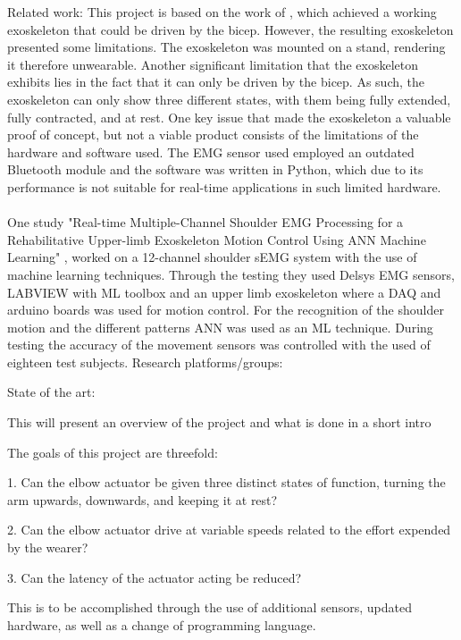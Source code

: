    Related work: %
        This project is based on the work of \cite{AFES}, which achieved a working exoskeleton that could be driven by the bicep. However, the resulting 
        exoskeleton presented some limitations. The exoskeleton was mounted on a stand, rendering it therefore unwearable. Another significant limitation 
        that the exoskeleton exhibits lies in the fact that it can only be driven by the bicep. As such, the exoskeleton can only show three different states, 
        with them being fully extended, fully contracted, and at rest. One key issue that made the exoskeleton a valuable proof of concept, but not a viable 
        product consists of the limitations of the hardware and software used. The EMG sensor used employed an outdated Bluetooth module and the software was 
        written in Python, which due to its performance is not suitable for real-time applications in such limited hardware. 
        \\\\
        One study "Real-time Multiple-Channel Shoulder EMG Processing for a Rehabilitative Upper-limb Exoskeleton Motion Control Using ANN Machine Learning" \cite{shoulderexo},
        worked on a 12-channel shoulder sEMG system with the use of machine learning techniques. Through the testing they used Delsys EMG sensors, LABVIEW with ML toolbox and an 
        upper limb exoskeleton where a DAQ and arduino boards was used for motion control. For the recognition of the shoulder motion and the different patterns ANN was used as an 
        ML technique. During testing the accuracy of the movement sensors was controlled with the used of eighteen test subjects.
    Research platforms/groups:

    State of the art:


    This will present an overview of the project and what is done in a short intro


The goals of this project are threefold:

1. Can the elbow actuator be given three distinct states of function, turning the arm upwards, downwards, and keeping it at rest?

2. Can the elbow actuator drive at variable speeds related to the effort expended by the wearer?

3. Can the latency of the actuator acting be reduced?

This is to be accomplished through the use of additional sensors, updated hardware, as well as a change of programming language.